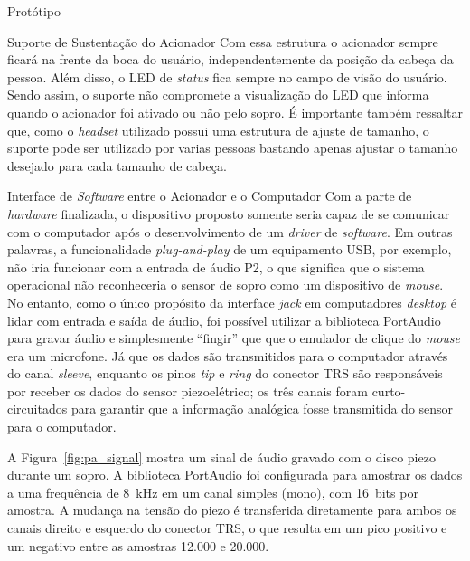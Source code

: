\begin{chapter}{Protótipo}
\begin{section}{Suporte de Sustentação do Acionador}
Com essa estrutura o acionador sempre ficará na frente da boca do usuário,
independentemente da posição da cabeça da pessoa. Além disso, o LED de
\textit{status} fica sempre no campo de visão do usuário. Sendo assim, o suporte
não compromete a visualização do LED que informa quando o acionador foi ativado
ou não pelo sopro. É importante também ressaltar que, como o \textit{headset}
utilizado possui uma estrutura de ajuste de tamanho, o suporte pode ser
utilizado por varias pessoas bastando apenas ajustar o tamanho desejado para
cada tamanho de cabeça. 

\end{section}

\begin{section}{Interface de \textit{Software} entre o Acionador e o Computador}
Com a parte de \textit{hardware} finalizada, o dispositivo proposto somente
seria capaz de se comunicar com o computador após o desenvolvimento de um
\textit{driver} de \textit{software}. Em outras palavras, a funcionalidade
\textit{plug-and-play} de um equipamento USB, por exemplo, não iria funcionar
com a entrada de áudio P2, o que significa que o sistema operacional não
reconheceria o sensor de sopro como um dispositivo de \textit{mouse}. No
entanto, como o único propósito da interface \textit{jack} em computadores
\textit{desktop} é lidar com entrada e saída de áudio, foi possível utilizar a
biblioteca PortAudio~\cite{portaudio} para gravar áudio e simplesmente
``fingir'' que que o emulador de clique do \textit{mouse} era um microfone. Já
que os dados são transmitidos para o computador através do canal
\textit{sleeve}, enquanto os pinos \textit{tip} e \textit{ring} do conector TRS
são responsáveis por receber os dados do sensor piezoelétrico; os três canais
foram curto-circuitados para garantir que a informação analógica fosse
transmitida do sensor para o computador.

A Figura~\ref{fig:pa_signal} mostra um sinal de áudio gravado com o disco piezo
durante um sopro. A biblioteca PortAudio foi configurada para amostrar os dados
a uma frequência de 8~kHz em um canal simples (mono), com 16~bits por amostra. A
mudança na tensão do piezo é transferida diretamente para ambos os canais
direito e esquerdo do conector TRS, o que resulta em um pico positivo e um
negativo entre as amostras 12.000 e 20.000.


\end{section}
\end{chapter}
